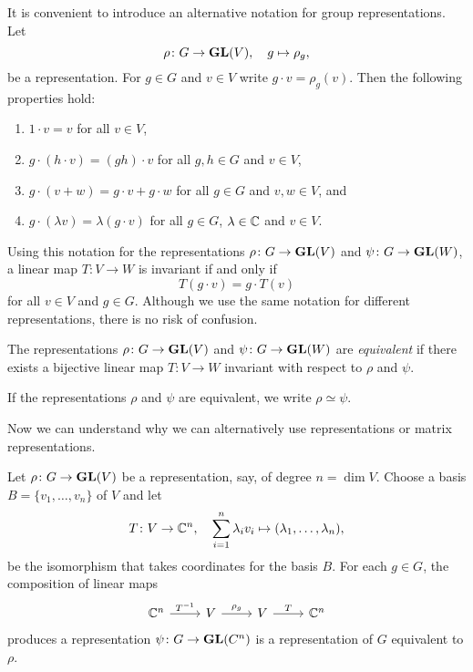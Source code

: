 It is convenient to introduce an alternative
notation for group representations. 
Let 
\[ 
\rho\colon G\to\mathbf{GL}(V),\quad g\mapsto \rho_g,
\]
be a representation. For
$g\in G$ and $v\in V$ write $g\cdot v=\rho_g(v)$. Then the following properties hold: 
\begin{enumerate}
	\item $1\cdot v=v$ for all $v\in V$, 
	\item $g\cdot (h\cdot v)=(gh)\cdot v$ for all $g,h\in G$ and $v\in V$, 
	\item $g\cdot (v+w)=g\cdot v+g\cdot w$ for all $g\in G$ and $v,w\in V$, and 
	\item $g\cdot (\lambda v)=\lambda (g\cdot v)$ for all $g\in G$, $\lambda\in\mathbb{C}$ and $v\in V$.  	
\end{enumerate}
Using this notation for the representations $\rho\colon G\to\mathbf{GL}(V)$ 
and $\psi\colon G\to\mathbf{GL}(W)$, a linear
map $T\colon V\to W$ is invariant if and only if
\[
T(g\cdot v)=g\cdot T(v)
\]
for all $v\in V$ and $g\in G$. 
Although we use the same notation for different representations, there is no risk of confusion. 

\begin{definition}
    The representations $\rho\colon G\to\mathbf{GL}(V)$ and $\psi\colon G\to\mathbf{GL}(W)$ are \emph{equivalent}
    if there exists a bijective linear 
    map $T\colon V\to W$ invariant with respect to $\rho$ and $\psi$.
\end{definition}

If the representations $\rho$ and 
$\psi$ are equivalent, we write 
$\rho\simeq\psi$. 

Now we can understand why we can alternatively use
representations or matrix representations. 

\begin{example}
\label{xca:change_of_basis}
Let $\rho\colon G\to\mathbf{GL}(V)$ be a representation, say, of degree 
$n=\dim V$. Choose a basis 
$B=\{v_1,\dots,v_n\}$ of $V$ and let 
\[
T\colon V\to\mathbb{C}^n,
\quad
\sum_{i=1}^n\lambda_iv_i\mapsto (\lambda_1,\dots,\lambda_n),
\]
be the isomorphism that takes coordinates 
for the basis $B$. For each $g\in G$, 
the composition of linear maps 
\[\begin{tikzcd}
	{\C^n} & V & V & {\C^n}
	\arrow["{T^{-1}}", from=1-1, to=1-2]
	\arrow["{\rho_g}", from=1-2, to=1-3]
	\arrow["T", from=1-3, to=1-4]
\end{tikzcd}
\]
produces a representation 
$\psi\colon G\to\mathbf{GL}(C^n)$
is a representation 
of $G$ equivalent to $\rho$.   
\end{example}


